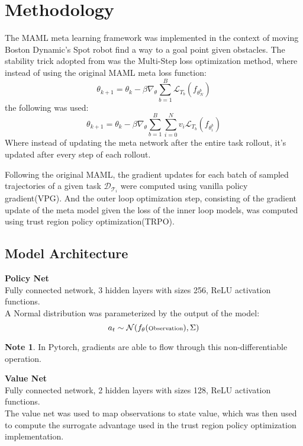 \documentclass{scrartcl}
\theoremstyle{definition}
\theoremstyle{note}
\newtheorem*{note}{Note}
\begin{document}
\section{Methodology}
The MAML meta learning framework was implemented in the context of moving Boston Dynamic's Spot robot
find a way to a goal point given obstacles.
The stability trick adopted from \cite{imp_maml} was the Multi-Step loss optimization method, where instead of using the
original MAML meta loss function:
\[  \theta_{k+1} = \theta_{k} - \beta \nabla _ \theta \sum \limits ^ B _ {b=1} \mathcal{L}_{T_{b}} (f_{\theta^b _N}) \]
the following was used:
\[  \theta_{k+1} = \theta_{k} - \beta \nabla _ \theta \sum \limits ^ B _ {b=1} \sum \limits ^ N _{i=0} v_i \mathcal{L}_{T_{b}} (f_{\theta^b _i}) \]
Where instead of updating the meta network after the entire task rollout, it's updated after every step of each rollout.

\noindent Following the original MAML, the gradient updates for 
each batch of sampled trajectories of a given task $ \mathcal{D}_{\mathcal{T}_i} $ 
were computed using vanilla policy gradient(VPG).
And the outer loop optimization step, consisting of the gradient update of the meta model
given the loss of the inner loop models, was computed using trust region policy optimization(TRPO).\cite{trpo}

\subsection{Model Architecture}
\textbf{Policy Net}\\
Fully connected network, 3 hidden layers with sizes 256, ReLU 
activation functions.\\
A Normal distribution was parameterized by the output of the model:
\[ a_t \sim \mathcal{N}(f_\theta(\text{\scriptsize Observation}), \Sigma)  \]
\begin{note}In Pytorch, gradients are able to flow through this non-differentiable operation.
\end{note}

\noindent \textbf{Value Net}\\
Fully connected network, 2 hidden layers with sizes 128, ReLU 
activation functions.\\
The value net was used to map observations to state value, which was then used to compute the surrogate advantage
used in the trust region policy optimization implementation.\cite{trpo}\\
\end{document}
